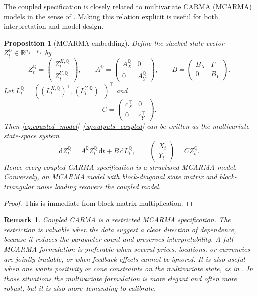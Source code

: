 \documentclass[10pt,a4paper,reqno]{amsart}
\newtheorem{proposition}[theorem]{Proposition}
\newtheorem{remark}[theorem]{Remark}
\newcommand{\R}{\mathbb{R}}
\newcommand{\Q}{\mathbb{Q}}
\newcommand{\1}{\mathbbm{1}}
\newcommand{\dd}{\mathrm{d}}
\begin{document}
The coupled specification is closely related to multivariate CARMA (MCARMA)
models in the sense of \citet{Mar07}. Making this relation explicit is useful
for both interpretation and model design.

\begin{proposition}[MCARMA embedding]
\label{prop:mcarma_embedding}
Define the stacked state vector \(Z_t^\Q \in \R^{p_X+p_Y}\) by
\[
Z_t^\Q
= \begin{pmatrix}
    Z_t^{X,\Q}\\
    Z_t^{Y,\Q}
  \end{pmatrix},
\qquad
A^\Q
= \begin{pmatrix}
    A_X^\Q & 0\\
    0 & A_Y^\Q
  \end{pmatrix},
\qquad
B
= \begin{pmatrix}
    B_X & \Gamma\\
    0 & B_Y
  \end{pmatrix}.
\]
Let \(L_t^\Q = ((L_t^{X,\Q})^\top,(L_t^{Y,\Q})^\top)^\top\) and
\[
C
= \begin{pmatrix}
    c_X^\top & 0\\
    0 & c_Y^\top
  \end{pmatrix}.
\]
Then \eqref{eq:coupled_model}--\eqref{eq:outputs_coupled} can be written as the
multivariate state-space system
\[
\dd Z_t^\Q = A^\Q Z_t^\Q\,\dd t + B\,\dd L_t^\Q,
\qquad
\begin{pmatrix}
  X_t\\
  Y_t
\end{pmatrix}
= C Z_t^\Q.
\]
Hence every coupled CARMA specification is a structured MCARMA model. Conversely,
an MCARMA model with block-diagonal state matrix and block-triangular noise
loading recovers the coupled model.
\end{proposition}

\begin{proof}
This is immediate from block-matrix multiplication.
\end{proof}

\begin{remark}
Coupled CARMA is a restricted MCARMA specification. The restriction is valuable
when the data suggest a clear
direction of dependence, because it reduces the parameter count and preserves
interpretability. A full MCARMA formulation is preferable when several prices,
locations, or currencies are jointly tradable, or when feedback effects cannot
be ignored. It is also useful when one wants positivity or cone constraints on
the multivariate state, as in \citet{Ben23}. In those situations the
multivariate formulation is more elegant and often more robust, but it is also
more demanding to calibrate.
\end{remark}
\end{document}
